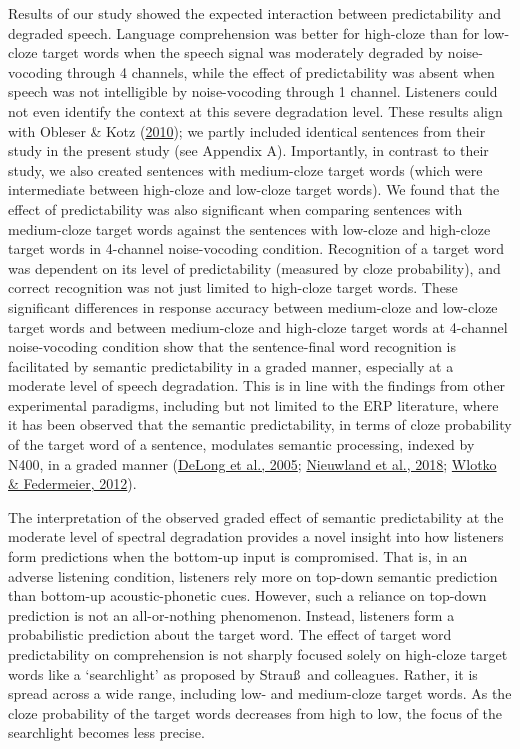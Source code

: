 \documentclass[a4paper, nobind]{templates/ociamthesis}
\begin{document}
Results of our study showed the expected interaction between predictability and degraded speech.
Language comprehension was better for high-cloze than for low-cloze target words when the speech signal was moderately degraded by noise-vocoding through 4 channels, while the effect of predictability was absent when speech was not intelligible by noise-vocoding through 1 channel.
Listeners could not even identify the context at this severe degradation level.
These results align with Obleser \& Kotz (\protect\hyperlink{ref-Obleser2010}{2010});
we partly included identical sentences from their study in the present study (see Appendix A).
Importantly, in contrast to their study, we also created sentences with medium-cloze target words (which were intermediate between high-cloze and low-cloze target words).
We found that the effect of predictability was also significant when comparing sentences with medium-cloze target words against the sentences with low-cloze and high-cloze target words in 4-channel noise-vocoding condition.
Recognition of a target word was dependent on its level of predictability (measured by cloze probability), and correct recognition was not just limited to high-cloze target words.
These significant differences in response accuracy between medium-cloze and low-cloze target words and between medium-cloze and high-cloze target words at 4-channel noise-vocoding condition show that the sentence-final word recognition is facilitated by semantic predictability in a graded manner,
especially at a moderate level of speech degradation.
This is in line with the findings from other experimental paradigms, including but not limited to the ERP literature, where it has been observed that the semantic predictability, in terms of cloze probability of the target word of a sentence, modulates semantic processing, indexed by N400, in a graded manner (\protect\hyperlink{ref-Delong2005}{DeLong et al., 2005}; \protect\hyperlink{ref-Nieuwland2018}{Nieuwland et al., 2018}; \protect\hyperlink{ref-Wlotko2012}{Wlotko \& Federmeier, 2012}).

The interpretation of the observed graded effect of semantic predictability at the moderate level of spectral degradation provides a novel insight into how listeners form predictions when the bottom-up input is compromised.
That is, in an adverse listening condition, listeners rely more on top-down semantic prediction than bottom-up acoustic-phonetic cues.
However, such a reliance on top-down prediction is not an all-or-nothing phenomenon.
Instead, listeners form a probabilistic prediction about the target word.
The effect of target word predictability on comprehension is not sharply focused solely on high-cloze target words like a `searchlight' as proposed by Strau\ss~and colleagues.
Rather, it is spread across a wide range, including low- and medium-cloze target words.
As the cloze probability of the target words decreases from high to low, the focus of the searchlight becomes less precise.
\end{document}
